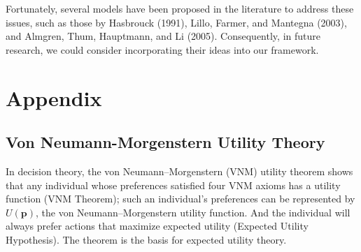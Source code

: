 \documentclass[13pt]{article}
\theoremstyle{definition}
\theoremstyle{remark}
\begin{document}
Fortunately, several models have been proposed in the literature to address these issues, such as those by Hasbrouck (1991), Lillo, Farmer, and Mantegna (2003), and Almgren, Thum, Hauptmann, and Li (2005). Consequently, in future research, we could consider incorporating their ideas into our framework.


\newpage
\section{Appendix}
\subsection{Von Neumann-Morgenstern Utility Theory}
In decision theory, {\color{C3}the von Neumann–Morgenstern (VNM) utility theorem shows that any individual whose preferences satisfied four VNM axioms has a utility function (VNM Theorem); such an individual's preferences can be represented by $U(\mathbf{p})$}, the von Neumann–Morgenstern utility function.  {\color{C2}And the individual will always prefer actions that maximize expected utility (Expected Utility Hypothesis).}  The theorem is the basis for expected utility theory.
\end{document}
